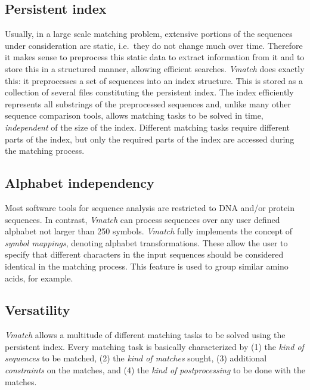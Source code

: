 \documentclass[12pt,titlepage]{article}
\begin{document}
\begin{AboutVmatch}

\subsection*{Persistent index}
Usually, in a large scale matching problem, extensive portions of the sequences
under consideration are static, i.e.\ they do not change much over time. 
Therefore it makes sense to preprocess this static data
to extract information from it and to store this in a structured manner,
allowing efficient searches.
\emph{Vmatch} does exactly this: it preprocesses a set of sequences
into an index structure. This is stored as a collection of several files
constituting the persistent index. The index efficiently represents all 
substrings of the preprocessed sequences and, unlike
many other sequence comparison tools, allows matching tasks to be solved
in time, \emph{independent} of the size of the index. Different matching
tasks require different parts of the index, but only the required parts
of the index are accessed during the matching process.

\subsection*{Alphabet independency}
Most software tools for sequence analysis are restricted to DNA
and/or protein sequences. In contrast, \emph{Vmatch} can process sequences
over any user defined alphabet not larger than 250 symbols.
\emph{Vmatch} fully implements the concept of \emph{symbol mappings},
denoting alphabet transformations. These allow the user to specify that 
different characters in the input sequences should be considered identical 
in the matching process. This feature is used 
to group similar amino acids, for example.

\subsection*{Versatility}
\emph{Vmatch} allows a multitude of different matching tasks to be solved
using the persistent index. Every matching task is basically characterized by
(1) the \emph{kind of sequences} to be matched,
(2) the \emph{kind of matches} sought,
(3) additional \emph{constraints} on the matches, and
(4) the \emph{kind of postprocessing} to be done with the matches.


\end{AboutVmatch}
\end{document}
